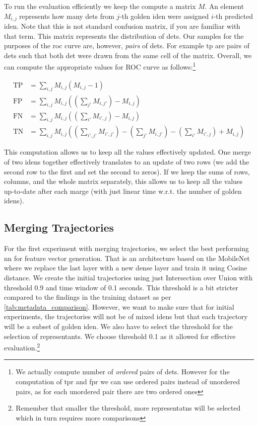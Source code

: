 To run the evaluation efficiently we keep the compute a matrix $M$. An element $M_{i,j}$ represents how many \glspl{det} from $j$-th golden \gls{iden} were assigned $i$-th predicted \gls{iden}. Note that this is not standard confusion matrix, if you are familiar with that term. This matrix represents the distribution of \glspl{det}. Our samples for the purposes of the \gls{roc} curve are, however, \emph{pairs} of \glspl{det}. For example \gls{tp} are pairs of \glspl{det} such that both \gls{det} were drawn from the same cell of the matrix. Overall, we can compute the appropriate values for ROC curve as follows:\footnote{We actually compute number of \emph{ordered} pairs of \glspl{det}. However for the computation of \gls{tpr} and \gls{fpr} we can use ordered pairs instead of unordered pairs, as for each unordered pair there are two ordered ones}

\begin{align*}
    \mathrm{TP} &= \sum_{i,j} M_{i,j} (M_{i,j} - 1)\\
    \mathrm{FP} &= \sum_{i,j} M_{i,j} \left(\left(\sum_{j'}M_{i,j'}\right)-M_{i,j}\right)\\
    \mathrm{FN} &= \sum_{i,j} M_{i,j} \left(\left(\sum_{i'}M_{i',j}\right)-M_{i,j}\right)\\
    \mathrm{TN} &= \sum_{i,j} M_{i,j} \left(\left(\sum_{i',j'}M_{i',j'}\right) - \left(\sum_{j'}M_{i,j'}\right) - \left(\sum_{i'}M_{i',j}\right) + M_{i,j}\right)
\end{align*}

This computation allows us to keep all the values effectively updated. One merge of two \glspl{iden} together effectively translates to an update of two rows (we add the second row to the first and set the second to zeros). If we keep the sums of rows, columns, and the whole matrix separately, this allows us to keep all the values up-to-date after each marge (with just linear time w.r.t. the number of golden \glspl{iden}).

\subsection{Merging Trajectories}

For the first experiment with merging trajectories, we select the best performing \gls{nn} for feature vector generation. That is an architecture based on the MobileNet where we replace the last layer with a new dense layer and train it using Cosine distance. We create the initial trajectories using just Intersection over Union with threshold 0.9 and time window of 0.1 seconds. This threshold is a bit stricter compared to the findings in the training dataset as per 
\autoref{tab:metadata_comparison}. However, we want to make sure that for initial experiments, the trajectories will not be of mixed \glspl{iden} but that each trajectory will be a subset of golden \gls{iden}. We also have to select the threshold for the selection of representants. We choose threshold 0.1 as it allowed for effective evaluation.\footnote{Remember that smaller the threshold, more representatns will be selected which in turn requires more comparisons}



